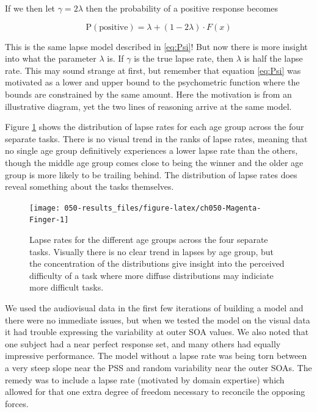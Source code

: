 \documentclass[11pt, oneside, openany]{scrbook}
\begin{document}
If we then let \(\gamma = 2\lambda\) then the probability of a positive response becomes

\[
\mathrm{P}(\textrm{positive}) = \lambda + (1 - 2\lambda) \cdot F(x)
\]

This is the same lapse model described in \eqref{eq:Psi}! But now there is more insight into what the parameter \(\lambda\) is. If \(\gamma\) is the true lapse rate, then \(\lambda\) is half the lapse rate. This may sound strange at first, but remember that equation \eqref{eq:Psi} was motivated as a lower and upper bound to the psychometric function where the bounds are constrained by the same amount. Here the motivation is from an illustrative diagram, yet the two lines of reasoning arrive at the same model.

Figure \ref{fig:ch050-Magenta-Finger} shows the distribution of lapse rates for each age group across the four separate tasks. There is no visual trend in the ranks of lapse rates, meaning that no single age group definitively experiences a lower lapse rate than the others, though the middle age group comes close to being the winner and the older age group is more likely to be trailing behind. The distribution of lapse rates does reveal something about the tasks themselves.

\begin{figure}

{\centering \texttt{[image: 050-results\_files/figure-latex/ch050-Magenta-Finger-1]} 

}

\caption{Lapse rates for the different age groups across the four separate tasks. Visually there is no clear trend in lapses by age group, but the concentration of the distributions give insight into the perceived difficulty of a task where more diffuse distributions may indiciate more difficult tasks.}\label{fig:ch050-Magenta-Finger}
\end{figure}

We used the audiovisual data in the first few iterations of building a model and there were no immediate issues, but when we tested the model on the visual data it had trouble expressing the variability at outer SOA values. We also noted that one subject had a near perfect response set, and many others had equally impressive performance. The model without a lapse rate was being torn between a very steep slope near the PSS and random variability near the outer SOAs. The remedy was to include a lapse rate (motivated by domain expertise) which allowed for that one extra degree of freedom necessary to reconcile the opposing forces.
\end{document}
